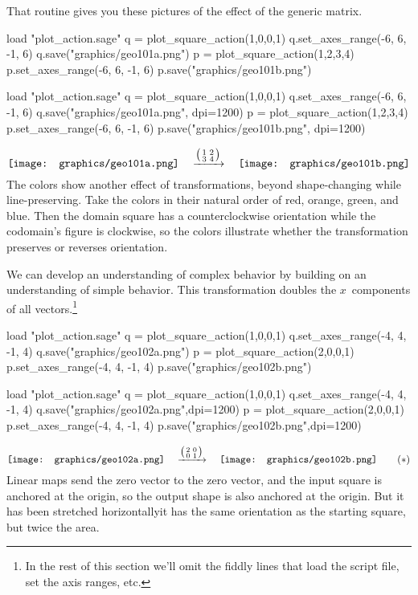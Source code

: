That routine gives you
these pictures of the effect of the generic matrix.
\begin{sageoutput}
load "plot_action.sage"
q = plot_square_action(1,0,0,1) 
q.set_axes_range(-6, 6, -1, 6) 
q.save("graphics/geo101a.png")
p = plot_square_action(1,2,3,4) 
p.set_axes_range(-6, 6, -1, 6) 
p.save("graphics/geo101b.png")
\end{sageoutput}
\begin{sagesilent}
load "plot_action.sage"
q = plot_square_action(1,0,0,1) 
q.set_axes_range(-6, 6, -1, 6) 
q.save("graphics/geo101a.png", dpi=1200)
p = plot_square_action(1,2,3,4) 
p.set_axes_range(-6, 6, -1, 6) 
p.save("graphics/geo101b.png", dpi=1200)
\end{sagesilent}
\begin{equation*}
  \vcenteredhbox{\texttt{[image: graphics/geo101a.png]}}
  \quad\mapsvia{\big (\begin{smallmatrix} 1 &2 \\ 3 &4 \end{smallmatrix}\big )}\quad
  \vcenteredhbox{\texttt{[image: graphics/geo101b.png]}}
\end{equation*}
The colors show another effect of transformations, beyond shape-changing
while line-preserving.
Take the colors in their natural order of red, orange, 
green, and blue.
Then the domain square has a counterclockwise orientation while the codomain's
figure is clockwise, so the colors illustrate whether the transformation 
preserves or reverses orientation.

We can develop an understanding of complex behavior by 
building on an understanding of simple behavior.
This transformation doubles the $x$~components of all 
vectors.\footnote{In the rest of this section we'll omit the fiddly
lines that load the script file, set the axis ranges, etc.} 
\begin{sageoutput}[d,0,4;d,5,7]
load "plot_action.sage"
q = plot_square_action(1,0,0,1) 
q.set_axes_range(-4, 4, -1, 4) 
q.save("graphics/geo102a.png")
p = plot_square_action(2,0,0,1)  
p.set_axes_range(-4, 4, -1, 4) 
p.save("graphics/geo102b.png")
\end{sageoutput}
\begin{sagesilent}
load "plot_action.sage"
q = plot_square_action(1,0,0,1) 
q.set_axes_range(-4, 4, -1, 4) 
q.save("graphics/geo102a.png",dpi=1200)
p = plot_square_action(2,0,0,1)  
p.set_axes_range(-4, 4, -1, 4) 
p.save("graphics/geo102b.png",dpi=1200)
\end{sagesilent}
\begin{equation*}
  \vcenteredhbox{\texttt{[image: graphics/geo102a.png]}}
  \quad\mapsvia{\big (\begin{smallmatrix} 2 &0 \\ 0 &1 \end{smallmatrix}\big )}\quad
  \vcenteredhbox{\texttt{[image: graphics/geo102b.png]}}
  \tag{$*$}
\end{equation*}
\noindent
Linear maps send the zero vector to the zero vector, and the input
square is anchored at the origin, so 
the output shape is also anchored at the origin.
But it has been stretched horizontally\Dash it has the same orientation
as the starting square, but twice the area.

